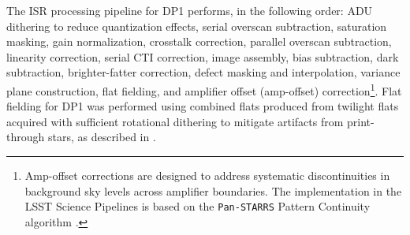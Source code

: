 The \gls{ISR} processing pipeline for \gls{DP1} performs, in the following order: \gls{ADU} dithering to reduce quantization effects, serial overscan subtraction, saturation masking, gain normalization, crosstalk correction, parallel overscan subtraction, linearity correction, serial \gls{CTI} correction, image assembly, bias subtraction, dark subtraction, brighter-fatter correction, defect masking and interpolation, variance plane construction, flat fielding, and amplifier offset (amp-offset) correction\footnote{Amp-offset corrections are designed to address systematic discontinuities in background sky levels across amplifier boundaries. The implementation in the LSST Science Pipelines is based on the \texttt{Pan-STARRS} Pattern Continuity algorithm \citep{2020ApJS..251....4W}.}.
Flat fielding for \gls{DP1} was performed using combined flats produced from twilight flats acquired with sufficient rotational dithering to mitigate artifacts from print-through stars, as described in .



